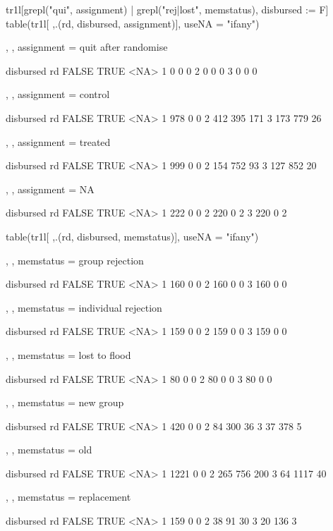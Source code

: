 \begin{Schunk}
\begin{Sinput}
tr1l[grepl("qui", assignment) | grepl("rej|lost", memstatus), disbursed := F]
table(tr1l[ ,.(rd, disbursed, assignment)], useNA = "ifany")
\end{Sinput}
\begin{Soutput}
, , assignment = quit after randomise

   disbursed
rd  FALSE TRUE <NA>
  1     0    0    0
  2     0    0    0
  3     0    0    0

, , assignment = control

   disbursed
rd  FALSE TRUE <NA>
  1   978    0    0
  2   412  395  171
  3   173  779   26

, , assignment = treated

   disbursed
rd  FALSE TRUE <NA>
  1   999    0    0
  2   154  752   93
  3   127  852   20

, , assignment = NA

   disbursed
rd  FALSE TRUE <NA>
  1   222    0    0
  2   220    0    2
  3   220    0    2
\end{Soutput}
\begin{Sinput}
table(tr1l[ ,.(rd, disbursed, memstatus)], useNA = "ifany")
\end{Sinput}
\begin{Soutput}
, , memstatus = group rejection

   disbursed
rd  FALSE TRUE <NA>
  1   160    0    0
  2   160    0    0
  3   160    0    0

, , memstatus = individual rejection

   disbursed
rd  FALSE TRUE <NA>
  1   159    0    0
  2   159    0    0
  3   159    0    0

, , memstatus = lost to flood

   disbursed
rd  FALSE TRUE <NA>
  1    80    0    0
  2    80    0    0
  3    80    0    0

, , memstatus = new group

   disbursed
rd  FALSE TRUE <NA>
  1   420    0    0
  2    84  300   36
  3    37  378    5

, , memstatus = old

   disbursed
rd  FALSE TRUE <NA>
  1  1221    0    0
  2   265  756  200
  3    64 1117   40

, , memstatus = replacement

   disbursed
rd  FALSE TRUE <NA>
  1   159    0    0
  2    38   91   30
  3    20  136    3
\end{Soutput}
\end{Schunk}
